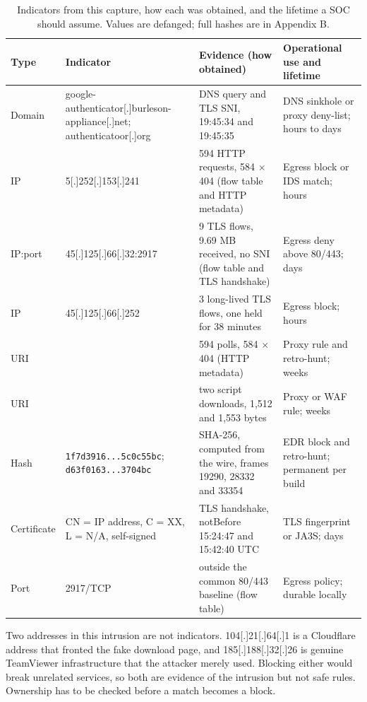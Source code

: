 \begin{table}[htbp]
  \centering
  \caption{Indicators from this capture, how each was obtained, and the lifetime a SOC should assume. Values are defanged; full hashes are in Appendix B.}
  \label{tab:iocs}
  \scriptsize
  \setlength{\tabcolsep}{3pt}
  \begin{tabularx}{\linewidth}{@{}lYYY@{}}
    \toprule
    \textbf{Type} & \textbf{Indicator} & \textbf{Evidence (how obtained)} & \textbf{Operational use and lifetime} \\
    \midrule
    Domain & google-authenticator[.]burleson-appliance[.]net; authenticatoor[.]org
      & DNS query and TLS SNI, 19:45:34 and 19:45:35
      & DNS sinkhole or proxy deny-list; hours to days \\
    IP & 5[.]252[.]153[.]241
      & 594 HTTP requests, 584 $\times$ 404 (flow table and HTTP metadata)
      & Egress block or IDS match; hours \\
    IP:port & 45[.]125[.]66[.]32:2917
      & 9 TLS flows, 9.69 MB received, no SNI (flow table and TLS handshake)
      & Egress deny above 80/443; days \\
    IP & 45[.]125[.]66[.]252
      & 3 long-lived TLS flows, one held for 38 minutes
      & Egress block; hours \\
    URI & 
      & 594 polls, 584 $\times$ 404 (HTTP metadata)
      & Proxy rule and retro-hunt; weeks \\
    URI & 
      & two script downloads, 1,512 and 1,553 bytes
      & Proxy or WAF rule; weeks \\
    Hash & \texttt{1f7d3916...5c0c55bc}; \texttt{d63f0163...3704bc}
      & SHA-256, computed from the wire, frames 19290, 28332 and 33354
      & EDR block and retro-hunt; permanent per build \\
    Certificate & CN = IP address, C = XX, L = N/A, self-signed
      & TLS handshake, notBefore 15:24:47 and 15:42:40 UTC
      & TLS fingerprint or JA3S; days \\
    Port & 2917/TCP
      & outside the common 80/443 baseline (flow table)
      & Egress policy; durable locally \\
    \bottomrule
  \end{tabularx}
\end{table}

Two addresses in this intrusion are not indicators. 104[.]21[.]64[.]1 is a Cloudflare address that fronted the fake download page, and 185[.]188[.]32[.]26 is genuine TeamViewer infrastructure that the attacker merely used. Blocking either would break unrelated services, so both are evidence of the intrusion but not safe rules. Ownership has to be checked before a match becomes a block.

